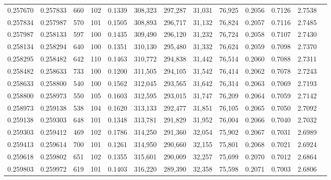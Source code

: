 \begin{tabular}{rrrrrrrrrrrrr}
0.257670 & 0.257833 &   660 & 102 &                                     0.1339 & 308,323 & 297,287 &  31,031 &  76,925 & 0.2056 & 0.7126 & 2.7538 \\
0.257834 & 0.257987 &   570 & 101 &                                     0.1505 & 308,893 & 296,717 &  31,132 &  76,824 & 0.2057 & 0.7116 & 2.7485 \\
0.257987 & 0.258133 &   597 & 100 &                                     0.1435 & 309,490 & 296,120 &  31,232 &  76,724 & 0.2058 & 0.7107 & 2.7430 \\
0.258134 & 0.258294 &   640 & 100 &                                     0.1351 & 310,130 & 295,480 &  31,332 &  76,624 & 0.2059 & 0.7098 & 2.7370 \\
0.258295 & 0.258482 &   642 & 110 &                                     0.1463 & 310,772 & 294,838 &  31,442 &  76,514 & 0.2060 & 0.7088 & 2.7311 \\
0.258482 & 0.258633 &   733 & 100 &                                     0.1200 & 311,505 & 294,105 &  31,542 &  76,414 & 0.2062 & 0.7078 & 2.7243 \\
0.258633 & 0.258800 &   540 & 100 &                                     0.1562 & 312,045 & 293,565 &  31,642 &  76,314 & 0.2063 & 0.7069 & 2.7193 \\
0.258800 & 0.258973 &   550 & 105 &                                     0.1603 & 312,595 & 293,015 &  31,747 &  76,209 & 0.2064 & 0.7059 & 2.7142 \\
0.258973 & 0.259138 &   538 & 104 &                                     0.1620 & 313,133 & 292,477 &  31,851 &  76,105 & 0.2065 & 0.7050 & 2.7092 \\
0.259138 & 0.259303 &   648 & 101 &                                     0.1348 & 313,781 & 291,829 &  31,952 &  76,004 & 0.2066 & 0.7040 & 2.7032 \\
0.259303 & 0.259412 &   469 & 102 &                                     0.1786 & 314,250 & 291,360 &  32,054 &  75,902 & 0.2067 & 0.7031 & 2.6989 \\
0.259413 & 0.259614 &   700 & 101 &                                     0.1261 & 314,950 & 290,660 &  32,155 &  75,801 & 0.2068 & 0.7021 & 2.6924 \\
0.259618 & 0.259802 &   651 & 102 &                                     0.1355 & 315,601 & 290,009 &  32,257 &  75,699 & 0.2070 & 0.7012 & 2.6864 \\
0.259803 & 0.259972 &   619 & 101 &                                     0.1403 & 316,220 & 289,390 &  32,358 &  75,598 & 0.2071 & 0.7003 & 2.6806 \\

\end{tabular}
